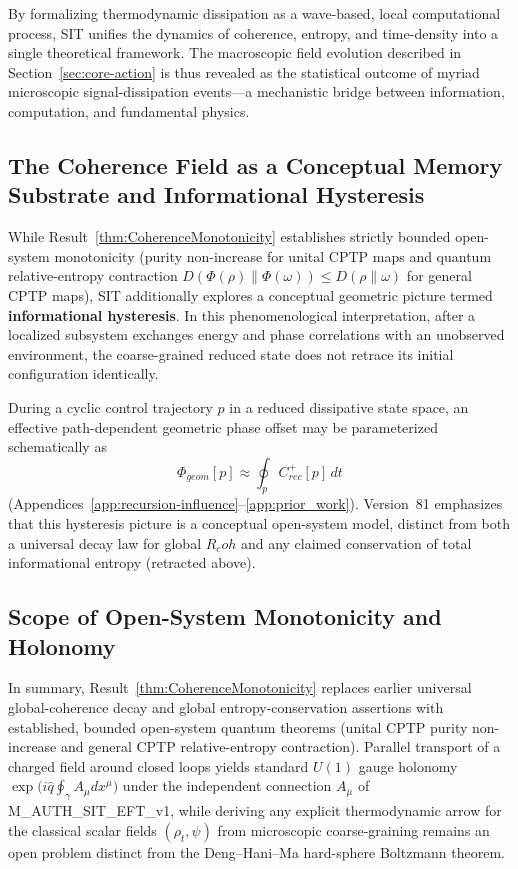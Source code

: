 \documentclass[american,11pt,letterpaper]{article}
\newcommand{\Rcoh}{R_{\mathrm{coh}}}
\def\mathrm#1{#1}%
\def\texttt#1{#1}%
\def\emph#1{#1}%
\def\Rcoh{R_coh}%
\begin{document}
By formalizing thermodynamic dissipation as a wave-based, local computational process, SIT unifies the dynamics of coherence, entropy, and time-density into a single theoretical framework.
The macroscopic field evolution described in Section~\ref{sec:core-action} is thus revealed as the statistical outcome of myriad microscopic signal-dissipation events---a mechanistic bridge between information, computation, and fundamental physics.

\subsection{The Coherence Field as a Conceptual Memory Substrate and Informational Hysteresis}
\label{sec:hysteresis_memory}
\label{sec:memory_substrate}

While Result~\ref{thm:CoherenceMonotonicity} establishes strictly \emph{bounded} open-system monotonicity (purity non-increase for unital CPTP maps and quantum relative-entropy contraction $D(\Phi(\rho)\|\Phi(\omega)) \le D(\rho\|\omega)$ for general CPTP maps), SIT additionally explores a conceptual geometric picture termed \textbf{informational hysteresis}. In this phenomenological interpretation, after a localized subsystem exchanges energy and phase correlations with an unobserved environment, the coarse-grained reduced state does not retrace its initial configuration identically.

During a cyclic control trajectory $p$ in a reduced dissipative state space, an effective path-dependent geometric phase offset may be parameterized schematically as
\begin{equation}
\Phi_{\mathrm{geom}}[p] \approx \oint_p C_{\mathrm{rec}}^+[p]\,dt
\label{eq:informational_hysteresis_loop}
\end{equation}
(Appendices~\ref{app:recursion-influence}--\ref{app:prior_work}). Version~81 emphasizes that this hysteresis picture is a \emph{conceptual open-system model}, distinct from both a universal decay law for global $\Rcoh$ and any claimed conservation of total informational entropy (retracted above).

\subsection{Scope of Open-System Monotonicity and Holonomy}

In summary, Result~\ref{thm:CoherenceMonotonicity} replaces earlier universal global-coherence decay and global entropy-conservation assertions with established, bounded open-system quantum theorems (unital CPTP purity non-increase and general CPTP relative-entropy contraction). Parallel transport of a charged field around closed loops yields standard $U(1)$ gauge holonomy $\exp\bigl(i\hat{q}\oint_\gamma A_\mu dx^\mu\bigr)$ under the independent connection $A_\mu$ of \texttt{M\_AUTH\_SIT\_EFT\_v1}, while deriving any explicit thermodynamic arrow for the classical scalar fields $(\rho_t, \psi)$ from microscopic coarse-graining remains an open problem distinct from the Deng--Hani--Ma hard-sphere Boltzmann theorem.
\end{document}
